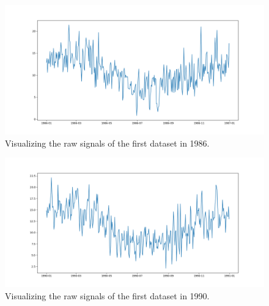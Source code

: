 \begin{figure}[H]
    \centering
    \begin{minipage}[b]{1\textwidth}
        \includegraphics[width=\textwidth]{figures/Ass1/Ass1_D1_raw_signal_1986.png}
    \end{minipage}
    \caption{Visualizing the raw signals of the first dataset in 1986.}
    \label{fig:Ass1_D1_raw_signal_1986}
\end{figure}

\begin{figure}[H]
    \centering
    \begin{minipage}[b]{1\textwidth}
        \includegraphics[width=\textwidth]{figures/Ass1/Ass1_D1_raw_signal_1990.png}
    \end{minipage}
    \caption{Visualizing the raw signals of the first dataset in 1990.}
    \label{fig:Ass1_D1_raw_signal_1990}
\end{figure}

